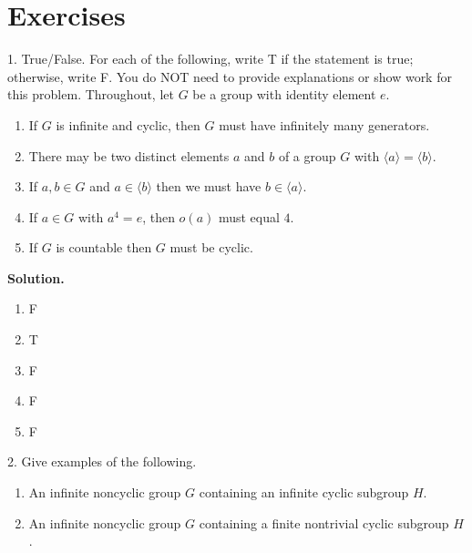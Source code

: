 \documentclass[10pt,]{book}
\theoremstyle{plain}
\theoremstyle{definition}
\theoremstyle{definition}
\theoremstyle{definition}
\theoremstyle{definition}
\numberwithin{equation}{section}
\begin{document}
\section[{Exercises}]{Exercises}\label{exercises-6}
\begin{exerciselist}
\item[1.]\hypertarget{exercise-34}{}True/False. For each of the following, write T if the statement is true; otherwise, write F. You do NOT need to provide explanations or show work for this problem. Throughout, let \(G\) be a group with identity element \(e\). \leavevmode%
\begin{enumerate}[label=(\alph*)]
\item\hypertarget{li-267}{}If \(G\) is infinite and cyclic, then \(G\) must have infinitely many generators.%
\item\hypertarget{li-268}{}There may be two distinct elements \(a\) and \(b\) of a group \(G\) with \(\langle a\rangle =\langle b\rangle\).%
\item\hypertarget{li-269}{}If \(a,b\in G\) and \(a\in \langle b\rangle\) then we must have \(b\in \langle a\rangle\).%
\item\hypertarget{li-270}{}If \(a\in G\) with \(a^4=e\), then \(o(a)\) must equal \(4\).%
\item\hypertarget{li-271}{}If \(G\) is countable then \(G\) must be cyclic.%
\end{enumerate}
%
\par\smallskip
\par\smallskip
\noindent\textbf{Solution.}\hypertarget{solution-34}{}\quad
\leavevmode%
\begin{multicols}{5}
\begin{enumerate}[label=(\alph*)]
\item\hypertarget{li-272}{}F%
\item\hypertarget{li-273}{}T%
\item\hypertarget{li-274}{}F%
\item\hypertarget{li-275}{}F%
\item\hypertarget{li-276}{}F%
\end{enumerate}
\end{multicols}
%
\item[2.]\hypertarget{exercise-35}{}Give examples of the following. \leavevmode%
\begin{enumerate}[label=(\alph*)]
\item\hypertarget{li-277}{}An infinite noncyclic group \(G\) containing an infinite cyclic subgroup \(H\).%
\item\hypertarget{li-278}{}An infinite noncyclic group \(G\) containing a finite nontrivial cyclic subgroup \(H\).%

\end{enumerate}
\end{exerciselist}
\end{document}
